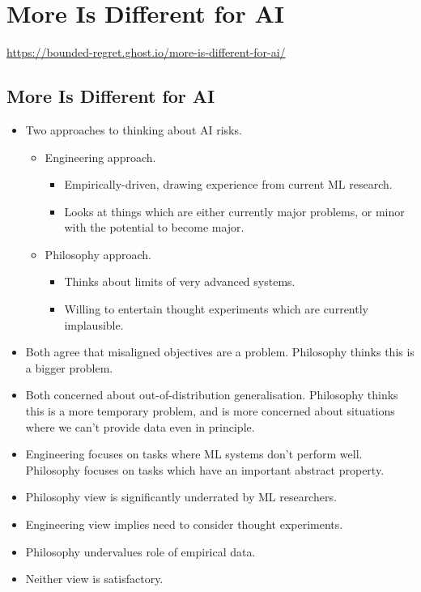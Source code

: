 \pagebreak

\section{More Is Different for AI}

\url{https://bounded-regret.ghost.io/more-is-different-for-ai/}


\subsection{More Is Different for AI}

\begin{itemize}
    \item Two approaches to thinking about AI risks.
    \begin{itemize}
        \item Engineering approach.
        \begin{itemize}
            \item Empirically-driven, drawing experience from current ML research.
            \item Looks at things which are either currently major problems, or minor with the potential to become major.
        \end{itemize}
        \item Philosophy approach.
        \begin{itemize}
            \item Thinks about limits of very advanced systems.
            \item Willing to entertain thought experiments which are currently implausible.
        \end{itemize}
    \end{itemize}
    \item Both agree that misaligned objectives are a problem. Philosophy thinks this is a bigger problem.
    \item Both concerned about out-of-distribution generalisation. Philosophy thinks this is a more temporary problem, and is more concerned about situations where we can't provide data even in principle.
    \item Engineering focuses on tasks where ML systems don't perform well. Philosophy focuses on tasks which have an important abstract property.
    \item Philosophy view is significantly underrated by ML researchers.
    \item Engineering view implies need to consider thought experiments.
    \item Philosophy undervalues role of empirical data.
    \item Neither view is satisfactory.
\end{itemize}


